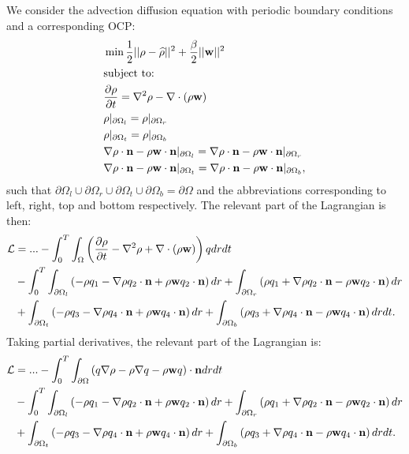 	We consider the advection diffusion equation with periodic boundary conditions and a corresponding OCP:
	\begin{align*}
		&\min \frac{1}{2}|| \rho - \widehat \rho||^2 + \frac{\beta}{2}||\mathbf{w}||^2\\
		&\text{subject to:}\\
		&\frac{\partial \rho}{\partial t} = \nabla^2 \rho - \nabla \cdot (\rho \mathbf{w})\\
		& \rho|_{\partial \Omega_l} = \rho|_{\partial \Omega_r}\\
		& \rho|_{\partial \Omega_t} = \rho|_{\partial \Omega_b}\\
		&\nabla \rho \cdot \mathbf{n} - \rho \mathbf{w} \cdot \mathbf{n}|_{\partial \Omega_l}= \nabla \rho \cdot \mathbf{n}  - \rho \mathbf{w} \cdot \mathbf{n} |_{\partial \Omega_r}\\
		& \nabla \rho \cdot \mathbf{n} - \rho \mathbf{w}  \cdot \mathbf{n}|_{\partial \Omega_t}= \nabla \rho \cdot \mathbf{n}  - \rho \mathbf{w} \cdot \mathbf{n}|_{\partial \Omega_b},
	\end{align*}
	such that $\partial\Omega_l \cup \partial\Omega_r \cup \partial\Omega_t \cup \partial\Omega_b = \partial \Omega$ and the abbreviations corresponding to left, right, top and bottom respectively.
	The relevant part of the Lagrangian is then:
	\begin{align*}
		\mathcal{L} &= ... -\int_0^T \int_\Omega \left(\frac{\partial \rho}{\partial t} - \nabla^2 \rho + \nabla \cdot (\rho \mathbf{w}) \right)q dr dt \\
		&- \int_0^T \int_{\partial \Omega_l} \left(- \rho q_1 - \nabla \rho q_2 \cdot \mathbf{n}  + \rho \mathbf{w} q_2 \cdot \mathbf{n} \right) dr  + \int_{\partial \Omega_r} \left(\rho q_1 + \nabla \rho q_2 \cdot \mathbf{n} - \rho \mathbf{w} q_2\cdot \mathbf{n}  \right)  dr  \\
		& + \int_{\partial \Omega_t} \left(- \rho q_3 - \nabla \rho q_4 \cdot \mathbf{n}  + \rho \mathbf{w} q_4 \cdot \mathbf{n}  \right)  dr  + \int_{\partial \Omega_b} \left(\rho q_3 + \nabla \rho q_4 \cdot \mathbf{n}  - \rho \mathbf{w} q_4  \cdot \mathbf{n} \right) drdt.
	\end{align*}
	Taking partial derivatives, the relevant part of the Lagrangian is:
	\begin{align*}
		\mathcal{L} &= ... - \int_0^T \int_{\partial \Omega} \left( q \nabla \rho - \rho\nabla q - \rho \mathbf{w} q \right) \cdot \mathbf{n}  dr dt\\
		&- \int_0^T \int_{\partial \Omega_l} \left(- \rho q_1 - \nabla \rho q_2\cdot \mathbf{n} + \rho \mathbf{w} q_2\cdot \mathbf{n} \right)   dr  + \int_{\partial \Omega_r} \left(\rho q_1 + \nabla \rho q_2 \cdot \mathbf{n}- \rho \mathbf{w} q_2\cdot \mathbf{n} \right)   dr  \\
		& + \int_{\partial \Omega_t} \left(- \rho q_3 - \nabla \rho q_4 \cdot \mathbf{n} + \rho \mathbf{w} q_4 \cdot \mathbf{n}\right) dr  + \int_{\partial \Omega_b} \left(\rho q_3 + \nabla \rho q_4 \cdot \mathbf{n} - \rho \mathbf{w} q_4 \cdot \mathbf{n} \right) drdt.
	\end{align*}
